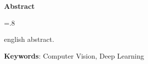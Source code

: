 


\pagestyle{empty}

\begin{latin}

\begin{center}
\textbf{Abstract}
\end{center}
\baselineskip=.8\baselineskip

english abstract.


\bigskip\noindent\textbf{Keywords}:
Computer Vision, Deep Learning
\end{latin}

\newpage
